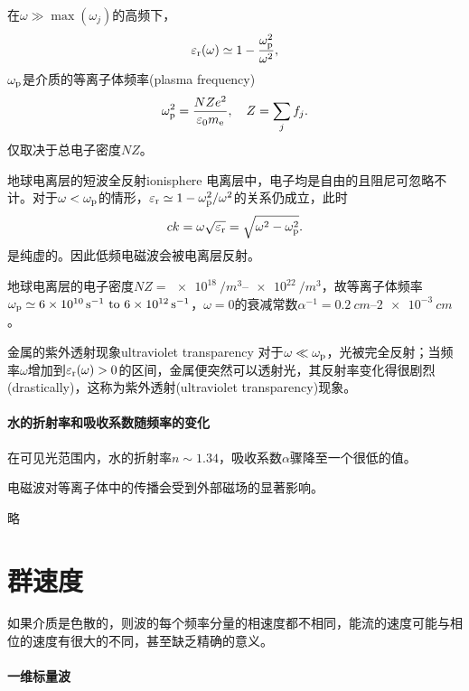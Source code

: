 在$\omega\gg\max(\omega_j)$的高频下，
\[
    \varepsilon_\text r(\omega)\simeq 1-\frac{\omega_\text p^2}{\omega^2},
\]
$\omega_\text p$是介质的等离子体频率(plasma frequency)
\begin{equation}
    \omega_\text p^2=\frac{NZe^2}{\varepsilon_0m_\mathrm e},\quad Z=\sum_jf_j.
\end{equation}
仅取决于总电子密度$NZ$。
\begin{example}{地球电离层的短波全反射}{ionisphere}
    电离层中，电子均是自由的且阻尼可忽略不计。对于$\omega<\omega_\text p$的情形，$\varepsilon_\text r\simeq 1-\omega_\text p^2/\omega^2$的关系仍成立，此时
    \[
        ck=\omega\sqrt{\varepsilon_\text r}=\sqrt{\omega^2-\omega_\text p^2}.
    \]
    是纯虚的。因此低频电磁波会被电离层反射。

    地球电离层的电子密度$NZ=\SIrange{e18}{e22}{/m^3}$，故等离子体频率$\omega_\text p\simeq\SIrange{6e10}{6e12}{s^{-1}}$，$\omega=0$的衰减常数$\alpha^{-1}=\SIrange{0.2}{2e-3}{cm}$。
\end{example}
\begin{example}{金属的紫外透射现象}{ultraviolet transparency}
    对于$\omega\ll\omega_\text p$，光被完全反射；当频率$\omega$增加到$\varepsilon_\text r(\omega)>0$的区间，金属便突然可以透射光，其反射率变化得很剧烈(drastically)，这称为紫外透射(ultraviolet transparency)现象。
\end{example}

\paragraph{水的折射率和吸收系数随频率的变化}

在可见光范围内，水的折射率$n\sim 1.34$，吸收系数$\alpha$骤降至一个很低的值。


电磁波对等离子体中的传播会受到外部磁场的显著影响。

略

\section{群速度}

如果介质是色散的，则波的每个频率分量的相速度都不相同，能流的速度可能与相位的速度有很大的不同，甚至缺乏精确的意义。

\paragraph{一维标量波}

